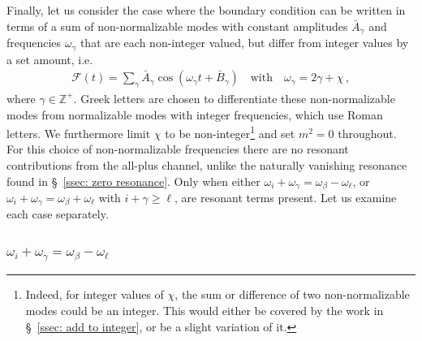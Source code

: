\documentclass[letterpaper,11pt]{article}
\newcommand{\oi}{\omega_i}
\newcommand{\ol}{\omega_\ell}
\newcommand{\mc}{\mathcal}
\newcommand{\obet}{\omega_{\beta}}
\newcommand{\ogam}{\omega_\gamma}
\begin{document}
Finally, let us consider the case where the boundary condition can be written in terms of a sum of non-normalizable modes with constant amplitudes $\bar A_\gamma$ and frequencies $\omega_\gamma$ that are each non-integer valued, but differ from integer values by a set amount, i.e.
\begin{align}
	\label{int plus chi}
	\mc F(t) = \sum_{\gamma} \bar A_{\gamma} \cos \left( \omega_\gamma t + \bar B_{\gamma} \right) \quad \text{with} \quad \ogam = 2\gamma + \chi \, ,
\end{align}
where $\gamma \in \mathbb{Z}^+$. Greek letters are chosen to differentiate these non-normalizable modes from normalizable modes with integer frequencies, which use Roman letters. We furthermore limit $\chi$ to be non-integer\footnote{Indeed, for integer values of $\chi$, the sum or difference of two non-normalizable modes could be an integer. This would either be covered by the work in \S\!~\ref{ssec: add to integer}, or be a slight variation of it.} and set $m^2 = 0$ throughout. For this choice of non-normalizable frequencies there are no resonant contributions from the all-plus channel, unlike the naturally vanishing resonance found in \S\!~\ref{ssec: zero resonance}. Only when either $\oi + \ogam = \obet - \ol$, or $\oi + \ogam = \obet + \ol$ with $i + \gamma \geq \ell$, are resonant terms present. Let us examine each case separately.


\subsubsection{$\oi + \ogam = \obet - \ol$}
\label{sssec: intpluschi1}
\end{document}
